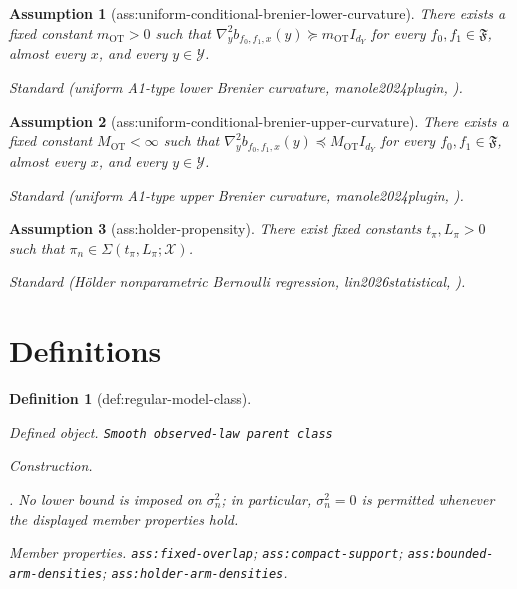 \documentclass{article}
\newtheorem{assumption}{Assumption}
\newtheorem{definition}{Definition}
\begin{document}
\begin{assumption}[ass:uniform-conditional-brenier-lower-curvature]\label{ass:uniform-conditional-brenier-lower-curvature}
There exists a fixed constant \(m_{\mathrm{OT}}>0\) such that \(\nabla_y^2 b_{f_0,f_1,x}(y)\succeq m_{\mathrm{OT}}I_{d_Y}\) for every \(f_0,f_1\in\mathfrak F\), almost every \(x\), and every \(y\in\mathcal Y\).
\par\smallskip\noindent\emph{Standard} (uniform A1-type lower Brenier curvature, manole2024plugin, \cite{manole2024plugin}).
\end{assumption}

\begin{assumption}[ass:uniform-conditional-brenier-upper-curvature]\label{ass:uniform-conditional-brenier-upper-curvature}
There exists a fixed constant \(M_{\mathrm{OT}}<\infty\) such that \(\nabla_y^2 b_{f_0,f_1,x}(y)\preceq M_{\mathrm{OT}}I_{d_Y}\) for every \(f_0,f_1\in\mathfrak F\), almost every \(x\), and every \(y\in\mathcal Y\).
\par\smallskip\noindent\emph{Standard} (uniform A1-type upper Brenier curvature, manole2024plugin, \cite{manole2024plugin}).
\end{assumption}

\begin{assumption}[ass:holder-propensity]\label{ass:holder-propensity}
There exist fixed constants \(t_\pi,L_\pi>0\) such that \(\pi_n\in\Sigma(t_\pi,L_\pi;\mathcal X)\).
\par\smallskip\noindent\emph{Standard} (H\"older nonparametric Bernoulli regression, lin2026statistical, \cite{lin2026statistical}).
\end{assumption}

\section{Definitions}

\begin{definition}[def:regular-model-class]\label{def:regular-model-class}
\par\smallskip\noindent\emph{Defined object.} \texttt{Smooth observed-\allowbreak{}law parent class}
\par\smallskip\noindent\emph{Construction.} \par\noindent {}\par\noindent. No lower bound is imposed on \(\sigma_n^2\); in particular, \(\sigma_n^2=0\) is permitted whenever the displayed member properties hold.
\par\smallskip\noindent\emph{Member properties.} \texttt{ass:\allowbreak{}fixed-\allowbreak{}overlap}; \texttt{ass:\allowbreak{}compact-\allowbreak{}support}; \texttt{ass:\allowbreak{}bounded-\allowbreak{}arm-\allowbreak{}densities}; \texttt{ass:\allowbreak{}holder-\allowbreak{}arm-\allowbreak{}densities}.
\end{definition}
\end{document}
